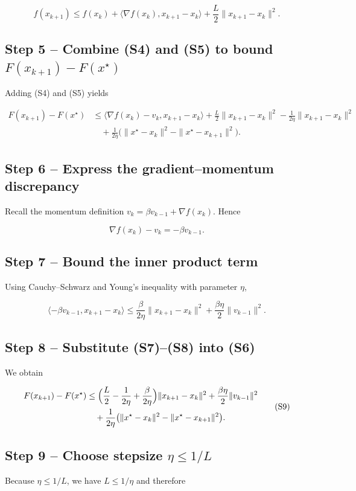 \documentclass{article}
\begin{document}
\[
f(x_{k+1})\le f(x_k)+\langle\nabla f(x_k),x_{k+1}-x_k\rangle+\frac{L}{2}\|x_{k+1}-x_k\|^{2}.
\tag{S5}
\]

\subsection*{Step 5 – Combine (S4) and (S5) to bound \(F(x_{k+1})-F(x^{\star})\)}
Adding (S4) and (S5) yields  

\[
\begin{aligned}
F(x_{k+1})-F(x^{\star})
&\le \langle\nabla f(x_k)-v_k, x_{k+1}-x_k\rangle
+\frac{L}{2}\|x_{k+1}-x_k\|^{2}
-\frac{1}{2\eta}\|x_{k+1}-x_k\|^{2} \\
&\quad +\frac{1}{2\eta}\bigl(\|x^{\star}-x_k\|^{2}
- \|x^{\star}-x_{k+1}\|^{2}\bigr).
\end{aligned}
\tag{S6}
\]

\subsection*{Step 6 – Express the gradient–momentum discrepancy}
Recall the momentum definition \(v_k=\beta v_{k-1}+\nabla f(x_k)\).  Hence  

\[
\nabla f(x_k)-v_k = -\beta v_{k-1}.
\tag{S7}
\]

\subsection*{Step 7 – Bound the inner product term}
Using Cauchy–Schwarz and Young’s inequality with parameter \(\eta\),

\[
\langle -\beta v_{k-1}, x_{k+1}-x_k\rangle
\le \frac{\beta}{2\eta}\|x_{k+1}-x_k\|^{2}
+\frac{\beta\eta}{2}\|v_{k-1}\|^{2}.
\tag{S8}
\]

\subsection*{Step 8 – Substitute (S7)–(S8) into (S6)}
We obtain  

\[
\begin{aligned}
F(x_{k+1})-F(x^{\star})
&\le
\Bigl(\frac{L}{2}-\frac{1}{2\eta}+\frac{\beta}{2\eta}\Bigr)\|x_{k+1}-x_k\|^{2}
+\frac{\beta\eta}{2}\|v_{k-1}\|^{2}\\
&\quad +\frac{1}{2\eta}\bigl(\|x^{\star}-x_k\|^{2}
-\|x^{\star}-x_{k+1}\|^{2}\bigr).
\end{aligned}
\tag{S9}
\]

\subsection*{Step 9 – Choose stepsize \(\eta\le 1/L\)}
Because \(\eta\le 1/L\), we have \(L\le 1/\eta\) and therefore  
\end{document}
